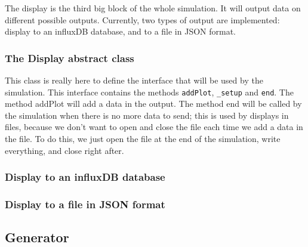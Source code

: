 The display is the third big block of the whole simulation. It will output data on different possible outputs. Currently, two types of output are implemented: display to an influxDB database, and to a file in JSON format.

\subsubsection{The Display abstract class}

This class is really here to define the interface that will be used by the simulation. This interface contains the methods \verb!addPlot!, \verb!_setup! and \verb!end!. The method addPlot will add a data in the output. The method end will be called by the simulation when there is no more data to send; this is used by displays in files, because we don't want to open and close the file each time we add a data in the file. To do this, we just open the file at the end of the simulation, write everything, and close right after.

\subsubsection{Display to an influxDB database}


\subsubsection{Display to a file in JSON format}



\subsection{Generator}

